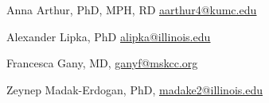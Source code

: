 




\begin{cvrefs}

  \cvref
    {Anna Arthur, PhD, MPH, RD \textcolor{navyblue}{\underline{\href{mailto:aarthur4@kumc.edu}{aarthur4@kumc.edu}}}}
    
      \cvref
    {Alexander Lipka, PhD \textcolor{navyblue}{\underline{\href{mailto:alipka@illinois.edu}{alipka@illinois.edu}}}}
    
      \cvref
    {Francesca Gany, MD, \textcolor{navyblue}{\underline{\href{mailto:ganyf@mskcc.org}{ganyf@mskcc.org}}}}
    
          \cvref
    {Zeynep Madak-Erdogan, PhD, \textcolor{navyblue}{\underline{\href{mailto:madake2@illinois.edu}{madake2@illinois.edu}}}}


  \end{cvrefs}